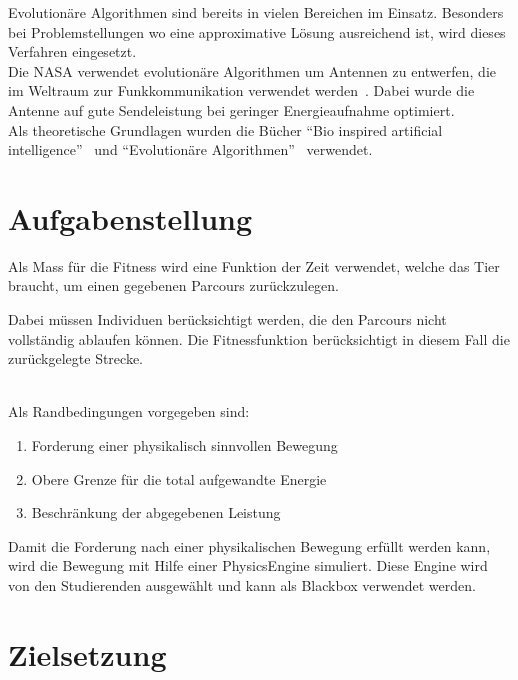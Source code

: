     Evolutionäre Algorithmen sind bereits in vielen Bereichen im Einsatz.
    Besonders bei Problemstellungen wo eine approximative Lösung ausreichend ist,
    wird dieses Verfahren eingesetzt.
    \\
    Die NASA verwendet evolutionäre Algorithmen um Antennen zu entwerfen,
    die im Weltraum zur Funkkommunikation verwendet werden~\cite{Hornby2006}.
    Dabei wurde die Antenne auf gute Sendeleistung bei geringer Energieaufnahme optimiert.
    \\
    Als theoretische Grundlagen wurden die Bücher ``Bio inspired artificial intelligence''~\cite{book:bioInspired} und
    ``Evolutionäre Algorithmen''~\cite{book:evAlgo} verwendet.


  \section{Aufgabenstellung}


    Als Mass für die Fitness wird eine Funktion der Zeit verwendet, welche das Tier braucht,
    um einen gegebenen Parcours zurückzulegen.


    Dabei müssen Individuen berücksichtigt werden, die den Parcours nicht vollständig ablaufen können.
    Die Fitnessfunktion berücksichtigt in diesem Fall die zurückgelegte Strecke.

    \\
    Als Randbedingungen vorgegeben sind:
    \begin{enumerate}
      \item Forderung einer physikalisch sinnvollen Bewegung
      \item Obere Grenze für die total aufgewandte Energie
      \item Beschränkung der abgegebenen Leistung
    \end{enumerate}
    Damit die Forderung nach einer physikalischen Bewegung erfüllt werden kann,
    wird die Bewegung mit Hilfe einer \gls{PhysicsEngine} simuliert.
    Diese Engine wird von den Studierenden ausgewählt und kann als Blackbox verwendet werden.

  \section{Zielsetzung}

